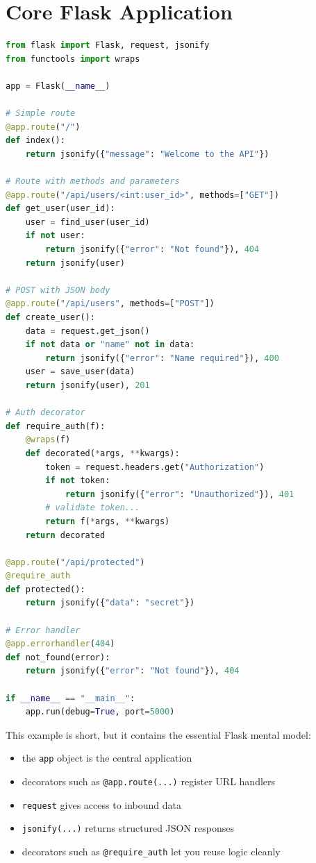 \documentclass[12pt, a4paper, oneside]{book}
\begin{document}
\section{Core Flask Application}

\begin{lstlisting}[language=Python, caption={Flask application}]
from flask import Flask, request, jsonify
from functools import wraps

app = Flask(__name__)

# Simple route
@app.route("/")
def index():
    return jsonify({"message": "Welcome to the API"})

# Route with methods and parameters
@app.route("/api/users/<int:user_id>", methods=["GET"])
def get_user(user_id):
    user = find_user(user_id)
    if not user:
        return jsonify({"error": "Not found"}), 404
    return jsonify(user)

# POST with JSON body
@app.route("/api/users", methods=["POST"])
def create_user():
    data = request.get_json()
    if not data or "name" not in data:
        return jsonify({"error": "Name required"}), 400
    user = save_user(data)
    return jsonify(user), 201

# Auth decorator
def require_auth(f):
    @wraps(f)
    def decorated(*args, **kwargs):
        token = request.headers.get("Authorization")
        if not token:
            return jsonify({"error": "Unauthorized"}), 401
        # validate token...
        return f(*args, **kwargs)
    return decorated

@app.route("/api/protected")
@require_auth
def protected():
    return jsonify({"data": "secret"})

# Error handler
@app.errorhandler(404)
def not_found(error):
    return jsonify({"error": "Not found"}), 404

if __name__ == "__main__":
    app.run(debug=True, port=5000)
\end{lstlisting}

This example is short, but it contains the essential Flask mental model:
\begin{itemize}[leftmargin=2em]
    \item the \texttt{app} object is the central application
    \item decorators such as \texttt{@app.route(...)} register URL handlers
    \item \texttt{request} gives access to inbound data
    \item \texttt{jsonify(...)} returns structured JSON responses
    \item decorators such as \texttt{@require\_auth} let you reuse logic cleanly
\end{itemize}
\end{document}
